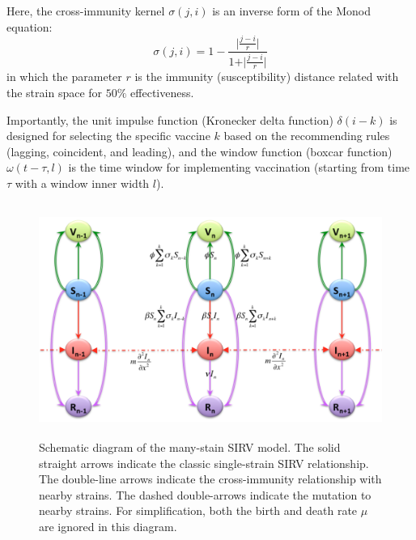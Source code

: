 \documentclass[preprint,12pt]{elsarticle}
\begin{document}
Here, the cross-immunity kernel \(\sigma(j,i)\) is an inverse form of the Monod equation:
\begin{equation}
  \label{eq:Immunity}
  \sigma(j,i) = 1 - \frac{\vert {\frac{j-i}{r}} \vert}{1 + \vert {\frac{j-i}{r}} \vert}
\end{equation}
in which the parameter \(r\) is the immunity (susceptibility) distance related with the strain space for \(50\%\) effectiveness. 

Importantly, the unit impulse function (Kronecker delta function) \(\delta(i-k)\) is designed for selecting the specific vaccine \(k\) based on the recommending rules (lagging, coincident, and leading), and the window function (boxcar function) \(\omega(t-\tau,l)\) is the time window for implementing vaccination (starting from time \(\tau\) with a window inner width \(l\)).

\begin{figure}
  \centering
  \includegraphics[width=6in,height=3in]{figures/Diagram}
  \caption{Schematic diagram of the many-stain SIRV model.
  The solid straight arrows indicate the classic single-strain SIRV relationship.
  The double-line arrows indicate the cross-immunity relationship with nearby strains.
  The dashed double-arrows indicate the mutation to nearby strains. For simplification, both the birth and death rate \(\mu\) are ignored in this diagram.}
\label{fig:Diagram}
\end{figure}
\end{document}
